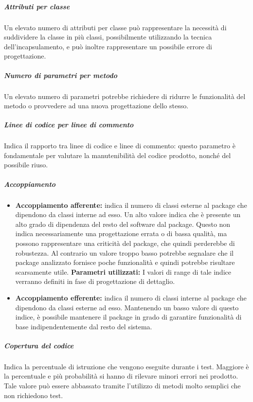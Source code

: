 \subparagraph{Attributi per classe}
Un elevato numero di attributi per classe può rappresentare la necessità di suddividere la classe in più classi, possibilmente utilizzando la tecnica dell'incapsulamento, e può inoltre rappresentare un possibile errore di progettazione.\\

\subparagraph{Numero di parametri per metodo}
Un elevato numero di parametri potrebbe richiedere di ridurre le funzionalità del metodo o provvedere ad una nuova progettazione dello stesso.\\

\subparagraph{Linee di codice per linee di commento}
Indica il rapporto tra linee di codice e linee di commento: questo parametro è fondamentale per valutare la manutenibilità del codice prodotto, nonché del possibile riuso.\\

\subparagraph{Accoppiamento}
\begin{itemize}
\item \textbf{Accoppiamento afferente:} indica il numero di classi esterne al package che dipendono da classi interne ad esso. Un alto valore indica che è presente un alto grado di dipendenza del resto del software dal package. Questo non indica necessariamente una progettazione errata o di bassa qualità, ma possono rappresentare una criticità del package, che quindi perderebbe di robustezza. Al contrario un valore troppo basso potrebbe segnalare che il package analizzato fornisce poche funzionalità e quindi potrebbe risultare scarsamente utile.
\textbf{Parametri utilizzati:}
I valori di range di tale indice verranno definiti in fase di progettazione di dettaglio.
\item \textbf{Accoppiamento efferente:} indica il numero di classi interne al package che dipendono da classi esterne ad esso. Mantenendo un basso valore di questo indice, è possibile mantenere il package in grado di garantire funzionalità di base indipendentemente dal resto del sistema.
\end{itemize}
\subparagraph{Copertura del codice}
Indica la percentuale di istruzione che vengono eseguite durante i test. Maggiore è la percentuale e più probabilità si hanno di rilevare minori errori nei prodotto. Tale valore può essere abbassato tramite l'utilizzo di metodi molto semplici che non richiedono test.\\